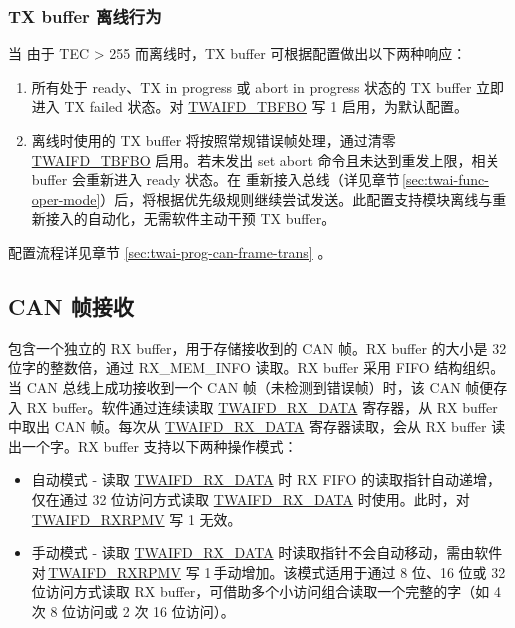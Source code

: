 \documentclass[main\_\_CN.tex]{subfiles}
\begin{document}
\subsubsection{TX buffer 离线行为}

当 \modulename{} 由于 TEC > 255 而离线时，TX buffer 可根据配置做出以下两种响应：

\begin{enumerate}
    \item 所有处于 ready、TX in progress 或 abort in progress 状态的 TX buffer 立即进入 TX failed 状态。对 \hyperref[fielddesc:TWAIFDTBFBO]{TWAIFD\_TBFBO} 写 1 启用，为默认配置。
    \item \modulename{} 离线时使用的 TX buffer 将按照常规错误帧处理，通过清零 \hyperref[fielddesc:TWAIFDTBFBO]{TWAIFD\_TBFBO} 启用。若未发出 set abort 命令且未达到重发上限，相关 buffer 会重新进入 ready 状态。在 \modulename{} 重新接入总线（详见章节 \ref{sec:twai-func-oper-mode}）后，将根据优先级规则继续尝试发送。此配置支持模块离线与重新接入的自动化，无需软件主动干预 TX buffer。
\end{enumerate}

配置流程详见章节 \ref{sec:twai-prog-can-frame-trans} \textit{}。


\subsection{CAN 帧接收}

\modulename{} 包含一个独立的 RX buffer，用于存储接收到的 CAN 帧。RX buffer 的大小是 32 位字的整数倍，通过 RX\_MEM\_INFO 读取。RX buffer 采用 FIFO 结构组织。当 CAN 总线上成功接收到一个 CAN 帧（未检测到错误帧）时，该 CAN 帧便存入 RX buffer。软件通过连续读取 \hyperref[regdesc:TWAIFDRXDATAREG]{TWAIFD\_RX\_DATA} 寄存器，从 RX buffer 中取出 CAN 帧。每次从 \hyperref[regdesc:TWAIFDRXDATAREG]{TWAIFD\_RX\_DATA} 寄存器读取，会从 RX buffer 读出一个字。RX buffer 支持以下两种操作模式：
\begin{itemize}
    \item 自动模式 - 读取 \hyperref[regdesc:TWAIFDRXDATAREG]{TWAIFD\_RX\_DATA} 时 RX FIFO 的读取指针自动递增，仅在通过 32 位访问方式读取 \hyperref[regdesc:TWAIFDRXDATAREG]{TWAIFD\_RX\_DATA} 时使用。此时，对 \hyperref[fielddesc:TWAIFDRXRPMV]{TWAIFD\_RXRPMV} 写 1 无效。
    \item 手动模式 - 读取 \hyperref[regdesc:TWAIFDRXDATAREG]{TWAIFD\_RX\_DATA} 时读取指针不会自动移动，需由软件对 \hyperref[fielddesc:TWAIFDRXRPMV]{TWAIFD\_RXRPMV} 写 1 手动增加。该模式适用于通过 8 位、16 位或 32 位访问方式读取 RX buffer，可借助多个小访问组合读取一个完整的字（如 4 次 8 位访问或 2 次 16 位访问）。
\end{itemize}
\end{document}
